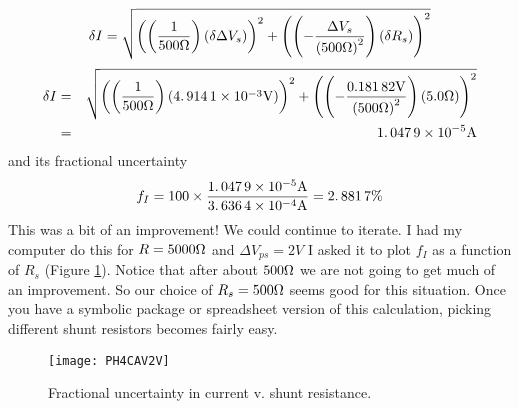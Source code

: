 \begin{equation*}
\delta I=\sqrt{\left( \left( \frac{1}{500\unit{%
\Omega%
}}\right) \left( \delta \Delta V_{s}\right) \right) ^{2}+\left( \left( -%
\frac{\Delta V_{s}}{\left( 500\unit{%
\Omega%
}\right) ^{2}}\right) \left( \delta R_{s}\right) \right) ^{2}}
\end{equation*}%
\begin{eqnarray*}
\delta I &=&\sqrt{\left( \left( \frac{1}{500\unit{%
\Omega%
}}\right) \left( 4.\,\allowbreak 914\,1\times 10^{-3}\unit{V}\right) \right)
^{2}+\left( \left( -\frac{0.181\,82\unit{V}}{\left( 500\unit{%
\Omega%
}\right) ^{2}}\right) \left( 5.0\unit{%
\Omega%
}\right) \right) ^{2}} \\
&=&1.\,\allowbreak 047\,9\times 10^{-5}\unit{A}
\end{eqnarray*}
and its fractional uncertainty%
\begin{equation*}
f_{I}=100\times \frac{1.\,\allowbreak 047\,9\times 10^{-5}\unit{A}}{%
3.\,\allowbreak 636\,4\times 10^{-4}\unit{A}}=2.\,\allowbreak 881\,7\%
\end{equation*}
This was a bit of an improvement! We could continue to iterate. I had my
computer do this for $R=5000\unit{%
\Omega%
}$ and $\Delta V_{ps}=2\unit{V}$ I asked it to plot $f_{I}$ as a function of 
$R_{s}$ (Figure \ref{fig:uncplot}).
Notice that after about $500\unit{%
\Omega%
}$ we are not going to get much of an improvement. So our choice of $%
R_{s}=500\unit{%
\Omega%
}$ seems good for this situation. Once you have a symbolic package or
spreadsheet version of this calculation, picking different shunt resistors
becomes fairly easy.
\begin{figure}[htbp!]
	\centering
\texttt{[image: PH4CAV2V]}
	\caption[Fractional uncertainty in current v. shunt resistance]
	{Fractional uncertainty in current v. shunt resistance.}
	\label{fig:uncplot}
\end{figure}

